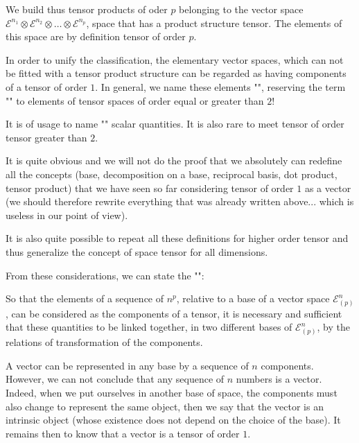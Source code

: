 	We build thus tensor products of oder $p$ belonging to the vector space $\mathcal{E}^{n_1}\otimes\mathcal{E}^{n_2}\otimes\ldots \otimes\mathcal{E}^{n_p}$, space that has a product structure tensor. The elements of this space are by definition tensor of order $p$.

	In order to unify the classification, the elementary vector spaces, which can not be fitted with a tensor product structure can be regarded as having components of a tensor of order $1$. In general, we name these elements "", reserving the term "" to elements of tensor spaces of order equal or greater than $2$!
	\begin{tcolorbox}[title=Remark,colframe=black,arc=10pt]
	It is of usage to name "" scalar quantities. It is also rare to meet tensor of order tensor greater than $2$.
	\end{tcolorbox}
	It is quite obvious and we will not do the proof  that we absolutely can redefine all the concepts (base, decomposition on a base, reciprocal basis, dot product, tensor product) that we have seen so far considering tensor of order $1$ as a vector (we should therefore rewrite everything that was already written above... which is useless in our point of view).

	It is also quite possible to repeat all these definitions for higher order tensor and thus generalize the concept of space tensor for all dimensions.

	From these considerations, we can state the "":
	
	So that the elements of a sequence of $n^p$, relative to a base of a vector space $\mathcal{E}_{(p)}^n$, can be considered as the components of a tensor, it is necessary and sufficient that these quantities to be linked together, in two different bases of $\mathcal{E}_{(p)}^n$, by the relations of transformation of the components.
	\begin{tcolorbox}[title=Remark,colframe=black,arc=10pt]
	A vector can be represented in any base by a sequence of $n$ components. However, we can not conclude that any sequence of $n$ numbers is a vector. Indeed, when we put ourselves in another base of space, the components must also change to represent the same object, then we say that the vector is an intrinsic object (whose existence does not depend on the choice of the base). It remains then to know that a vector is a tensor of order $1$.	
	\end{tcolorbox}

